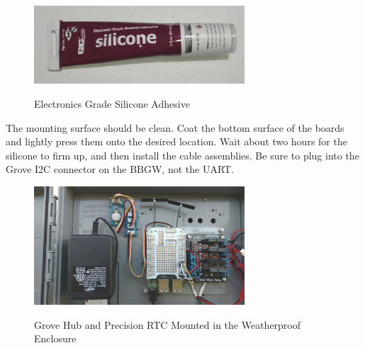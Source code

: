 \begin{figure}[H]
	\centering
	\includegraphics[width=0.7\textwidth]{photos/silicone}
	\centering\bfseries
	\caption{Electronics Grade Silicone Adhesive}
\end{figure}

The mounting surface should be clean.  Coat the bottom surface of the boards and lightly press them onto the desired location.  Wait about two hours for the silicone to firm up, and then install the cable assemblies.  Be sure to plug into the Grove I2C connector on the BBGW, not the UART.

\begin{figure}[H]
	\centering
	\includegraphics[width=0.7\textwidth]{photos/rtc-mounted}
	\centering\bfseries
	\caption{Grove Hub and Precision RTC Mounted in the Weatherproof Enclosure}
\end{figure}


